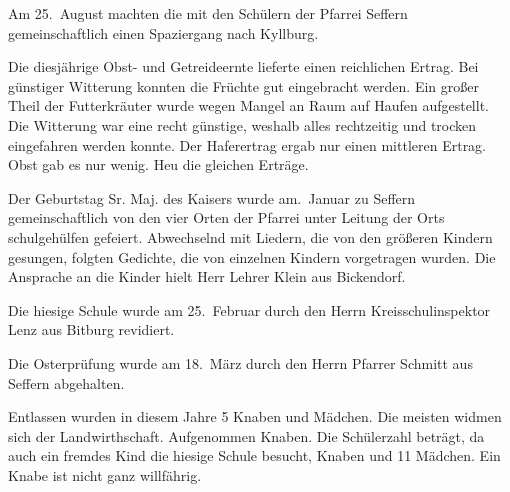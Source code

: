 

\pstart
Am 25.\ August machten die mit den Schülern der\ob
Pfarrei Seffern\unsicher{} gemeinschaftlich einen\ob
Spaziergang nach Kyllburg\unsicher.

\pend
{}
\pstart

Die diesjährige Obst- und Getreideernte lieferte\ob
einen reichlichen\unsicher{} Ertrag. Bei günstiger\ob
Witterung konnten die Früchte gut eingebracht\ob
werden. Ein großer Theil der Futterkräuter\unsicher\ob
wurde wegen Mangel an Raum auf Haufen\ob
aufgestellt. Die Witterung war eine recht günstige,\ob
weshalb alles rechtzeitig und trocken eingefahren\ob
werden konnte. Der Haferertrag ergab nur\ob
einen mittleren Ertrag. Obst gab es nur wenig. Heu die\ob
gleichen\unsicher{} Erträge\unsicher.

\pend
{}
\pstart

Der Geburtstag Sr. Maj. des Kaisers wurde am.\ Januar\unsicher{} zu Seffern gemeinschaftlich von den\ob
vier Orten der Pfarrei unter Leitung der Orts\ohb
schulgehülfen\unsicher{} gefeiert. Abwechselnd mit Liedern,\ob
die von den größeren Kindern gesungen, folgten\ob
Gedichte, die von einzelnen Kindern vorgetragen\ob
wurden. Die Ansprache an die Kinder hielt\ob
Herr Lehrer Klein\unsicher{} aus Bickendorf.

\pend
{}
\pstart

Die hiesige Schule wurde am 25.\ Februar durch den\ob
Herrn Kreisschulinspektor Lenz\unsicher{} aus Bitburg\ob
revidiert.

\pend
{}
\pstart

Die Osterprüfung wurde am 18.\ März durch den\ob
Herrn Pfarrer Schmitt aus Seffern abgehalten.

\pend
{}
\pstart


\pend
{}
\pstart

Entlassen wurden in diesem Jahre 5 Knaben und\unsicher{} Mädchen. Die meisten widmen sich der\ob
Landwirthschaft. Aufgenommen\unsicher{} Knaben.\ob
Die Schülerzahl beträgt, da auch ein fremdes\unsicher\ob
Kind die hiesige Schule besucht, Knaben und 11\unsicher{} Mädchen. Ein Knabe ist\ob
nicht ganz willfährig.
\pend
